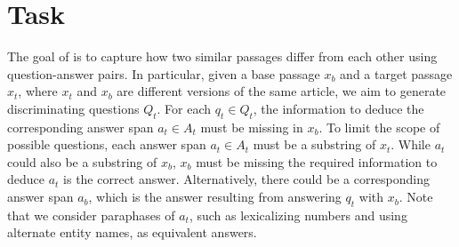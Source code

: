 \section{\dataset{} Task}


The goal of \dataset{} is to capture how two similar passages differ from each other using question-answer pairs. 
In particular, given a base passage $x_b$ and a target passage $x_t$, where $x_t$ and $x_b$ are different versions of the same article, we aim  to generate discriminating questions $Q_t$. For each $q_t \in Q_t$, the information to deduce the corresponding answer span $a_t \in A_t$ must be missing in $x_b$. To limit the scope of possible questions, each answer span $a_t \in A_t$ must be a substring of $x_t$. While $a_t$ could also be a substring of $x_b$, $x_b$ must be missing the required information to deduce $a_t$ is the correct answer. Alternatively, there could be a corresponding answer span $a_b$, which is the answer resulting from answering $q_t$ with $x_b$. Note that we consider paraphases of $a_t$, such as lexicalizing numbers and using alternate entity names, as equivalent answers. 


